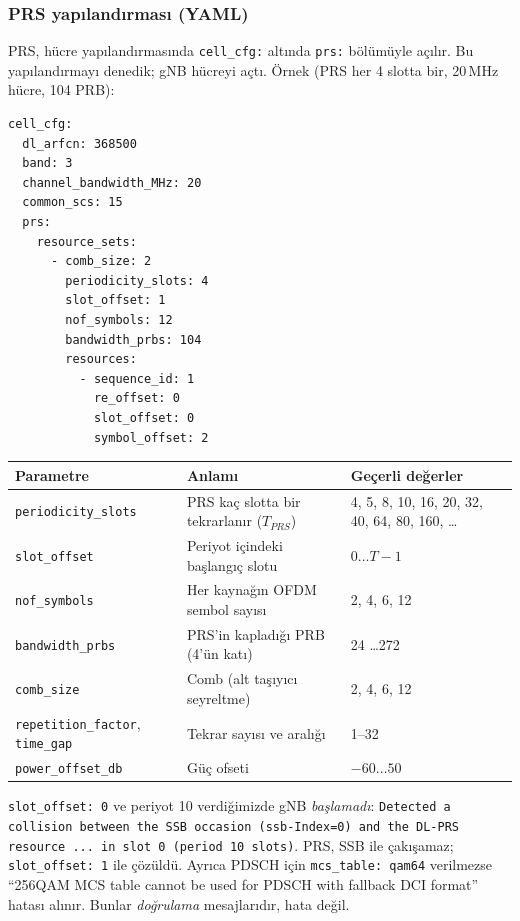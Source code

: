 \subsubsection{PRS yapılandırması (YAML)}

PRS, hücre yapılandırmasında \texttt{cell\_cfg:} altında \texttt{prs:} bölümüyle açılır. Bu yapılandırmayı denedik; gNB hücreyi açtı. Örnek (PRS her 4 slotta bir, 20\,MHz hücre, 104 PRB):

\begin{lstlisting}
cell_cfg:
  dl_arfcn: 368500
  band: 3
  channel_bandwidth_MHz: 20
  common_scs: 15
  prs:
    resource_sets:
      - comb_size: 2
        periodicity_slots: 4
        slot_offset: 1
        nof_symbols: 12
        bandwidth_prbs: 104
        resources:
          - sequence_id: 1
            re_offset: 0
            slot_offset: 0
            symbol_offset: 2
\end{lstlisting}

\begingroup\sffamily\small
\begin{xltabular}{\textwidth}{@{}p{3.4cm}p{4.6cm}X@{}}
\toprule
\textbf{Parametre} & \textbf{Anlamı} & \textbf{Geçerli değerler} \\
\midrule
\texttt{periodicity\_slots} & PRS kaç slotta bir tekrarlanır ($T_{PRS}$) & 4, 5, 8, 10, 16, 20, 32, 40, 64, 80, 160, \ldots \\
\texttt{slot\_offset} & Periyot içindeki başlangıç slotu & $0 \ldots T-1$ \\
\texttt{nof\_symbols} & Her kaynağın OFDM sembol sayısı & 2, 4, 6, 12 \\
\texttt{bandwidth\_prbs} & PRS'in kapladığı PRB (4'ün katı) & 24 \ldots 272 \\
\texttt{comb\_size} & Comb (alt taşıyıcı seyreltme) & 2, 4, 6, 12 \\
\texttt{repetition\_factor}, \texttt{time\_gap} & Tekrar sayısı ve aralığı & 1--32 \\
\texttt{power\_offset\_db} & Güç ofseti & $-60 \ldots 50$ \\
\bottomrule
\end{xltabular}
\endgroup

\begin{dikkat}
\texttt{slot\_offset: 0} ve periyot 10 verdiğimizde gNB \emph{başlamadı}:
\texttt{Detected a collision between the SSB occasion (ssb-Index=0) and the DL-PRS resource ... in slot 0 (period 10 slots)}.
PRS, SSB ile çakışamaz; \texttt{slot\_offset: 1} ile çözüldü. Ayrıca PDSCH için \texttt{mcs\_table: qam64} verilmezse
``256QAM MCS table cannot be used for PDSCH with fallback DCI format'' hatası alınır. Bunlar \emph{doğrulama} mesajlarıdır, hata değil.
\end{dikkat}

